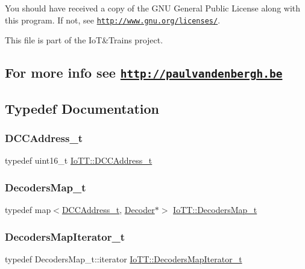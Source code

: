 You should have received a copy of the G\+NU General Public License along with this program. If not, see \href{http://www.gnu.org/licenses/}{\tt http\+://www.\+gnu.\+org/licenses/}. 

 This file is part of the IoT\&Trains project. \subsection*{For more info see \href{http://paulvandenbergh.be}{\tt http\+://paulvandenbergh.\+be} }

\subsection{Typedef Documentation}
\mbox{\label{namespaceIoTT_a31b8cd9473fc447b3fb341b78afa54fe}} 
\subsubsection{\texorpdfstring{D\+C\+C\+Address\+\_\+t}{DCCAddress\_t}}
{\footnotesize\ttfamily typedef uint16\+\_\+t \hyperlink{namespaceIoTT_a31b8cd9473fc447b3fb341b78afa54fe}{Io\+T\+T\+::\+D\+C\+C\+Address\+\_\+t}}

\mbox{\label{namespaceIoTT_a677ecaa41dfd1a0a7987bda3d12720f4}} 
\subsubsection{\texorpdfstring{Decoders\+Map\+\_\+t}{DecodersMap\_t}}
{\footnotesize\ttfamily typedef map$<$\hyperlink{namespaceIoTT_a31b8cd9473fc447b3fb341b78afa54fe}{D\+C\+C\+Address\+\_\+t}, \hyperlink{classIoTT_1_1Decoder}{Decoder}$\ast$$>$ \hyperlink{namespaceIoTT_a677ecaa41dfd1a0a7987bda3d12720f4}{Io\+T\+T\+::\+Decoders\+Map\+\_\+t}}

\mbox{\label{namespaceIoTT_aa58ce75b7106007510f71144195e192c}} 
\subsubsection{\texorpdfstring{Decoders\+Map\+Iterator\+\_\+t}{DecodersMapIterator\_t}}
{\footnotesize\ttfamily typedef Decoders\+Map\+\_\+t\+::iterator \hyperlink{namespaceIoTT_aa58ce75b7106007510f71144195e192c}{Io\+T\+T\+::\+Decoders\+Map\+Iterator\+\_\+t}}




